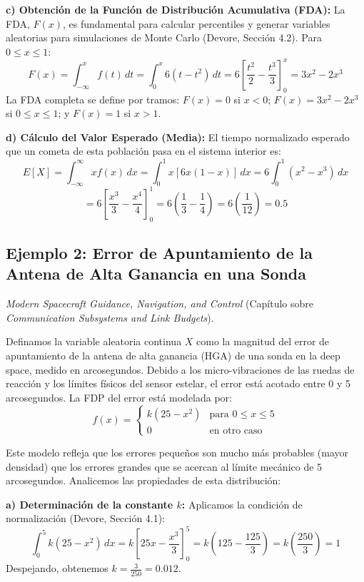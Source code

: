 \textbf{c) Obtención de la Función de Distribución Acumulativa (FDA):}
La FDA, $F(x)$, es fundamental para calcular percentiles y generar variables aleatorias para simulaciones de Monte Carlo (Devore, Sección 4.2). Para $0 \le x \le 1$:
$$ F(x) = \int_{-\infty}^{x} f(t) \, dt = \int_{0}^{x} 6(t - t^2) \, dt = 6 \left[ \frac{t^2}{2} - \frac{t^3}{3} \right]_{0}^{x} = 3x^2 - 2x^3 $$
La FDA completa se define por tramos: $F(x) = 0$ si $x < 0$; $F(x) = 3x^2 - 2x^3$ si $0 \le x \le 1$; y $F(x) = 1$ si $x > 1$.

\textbf{d) Cálculo del Valor Esperado (Media):}
El tiempo normalizado esperado que un cometa de esta población pasa en el sistema interior es:
$$ E[X] = \int_{-\infty}^{\infty} x f(x) \, dx = \int_{0}^{1} x [6x(1 - x)] \, dx = 6 \int_{0}^{1} (x^2 - x^3) \, dx $$
$$ = 6 \left[ \frac{x^3}{3} - \frac{x^4}{4} \right]_{0}^{1} = 6 \left( \frac{1}{3} - \frac{1}{4} \right) = 6 \left( \frac{1}{12} \right) = 0.5 $$

\subsection{Ejemplo 2: Error de Apuntamiento de la Antena de Alta Ganancia en una Sonda}

\textit{Modern Spacecraft Guidance, Navigation, and Control} (Capítulo sobre \textit{Communication Subsystems and Link Budgets}). 

Definamos la variable aleatoria continua $X$ como la magnitud del error de apuntamiento de la antena de alta ganancia (HGA) de una sonda en la deep space, medido en arcosegundos. Debido a los micro-vibraciones de las ruedas de reacción y los límites físicos del sensor estelar, el error está acotado entre 0 y 5 arcosegundos. La FDP del error está modelada por:
$$
f(x) = 
\begin{cases} 
k(25 - x^2) & \text{para } 0 \le x \le 5 \\
0 & \text{en otro caso}
\end{cases}
$$

Este modelo refleja que los errores pequeños son mucho más probables (mayor densidad) que los errores grandes que se acercan al límite mecánico de 5 arcosegundos. Analicemos las propiedades de esta distribución:

\textbf{a) Determinación de la constante $k$:}
Aplicamos la condición de normalización (Devore, Sección 4.1):
$$ \int_{0}^{5} k(25 - x^2) \, dx = k \left[ 25x - \frac{x^3}{3} \right]_{0}^{5} = k \left( 125 - \frac{125}{3} \right) = k \left( \frac{250}{3} \right) = 1 $$
Despejando, obtenemos $k = \frac{3}{250} = 0.012$.

